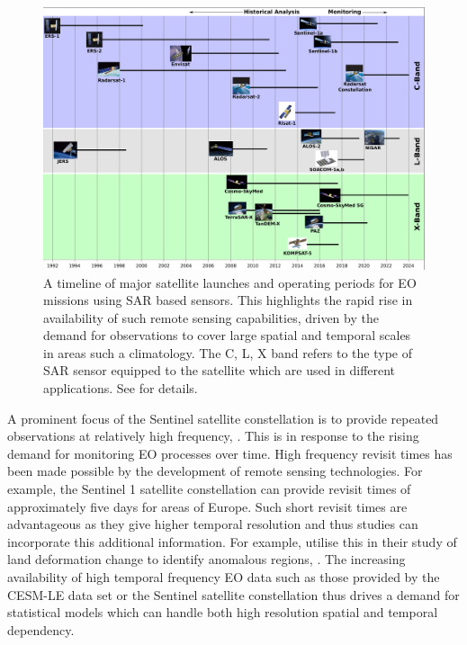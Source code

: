 \begin{figure}[htbp!] 
	\centering    
	\includegraphics[width=1.0\textwidth]{Sensors}
	\caption[Timeline of the major EO satellite launches and operation time scales.]{A timeline of major satellite launches and operating periods for EO missions using SAR based sensors. This highlights the rapid rise in availability of such remote sensing capabilities, driven by the demand for observations to cover large spatial and temporal scales in areas such a climatology. The C, L, X band refers to the type of SAR sensor equipped to the satellite which are used in different applications. See \citep{oliver_understanding_2004} for details.}
	\label{fig:sar_timeline}
\end{figure}

A prominent focus of the Sentinel satellite constellation is to provide repeated observations at relatively high frequency, \cite{aschbacher_european_2012}.
This is in response to the rising demand for monitoring EO processes over time.
High frequency revisit times has been made possible by the development of remote sensing technologies.
For example, the Sentinel 1 satellite constellation can provide revisit times of approximately five days for areas of Europe.
Such short revisit times are advantageous as they give higher temporal resolution and thus studies can incorporate this additional information.
For example, \citeauthor{raspini_continuous_2018} utilise this in their study of land deformation change to identify anomalous regions, \citep{raspini_continuous_2018}.
The increasing availability of high temporal frequency EO data such as those provided by the CESM-LE data set or the Sentinel satellite constellation thus drives a demand for statistical models which can handle both high resolution spatial and temporal dependency.  

